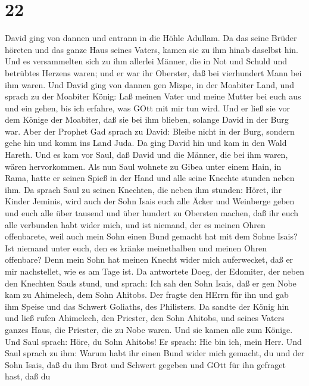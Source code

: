 \hypertarget{section-21}{%
\section{22}\label{section-21}}

 David ging von dannen und entrann in die Höhle Adullam. Da
das seine Brüder höreten und das ganze Haus seines Vaters, kamen sie zu
ihm hinab daselbst hin.  Und es versammelten sich zu ihm
allerlei Männer, die in Not und Schuld und betrübtes Herzens waren; und
er war ihr Oberster, daß bei vierhundert Mann bei ihm waren.
 Und David ging von dannen gen Mizpe, in der Moabiter Land,
und sprach zu der Moabiter König: Laß meinen Vater und meine Mutter bei
euch aus und ein gehen, bis ich erfahre, was GOtt mit mir tun wird.
 Und er ließ sie vor dem Könige der Moabiter, daß sie bei
ihm blieben, solange David in der Burg war.  Aber der
Prophet Gad sprach zu David: Bleibe nicht in der Burg, sondern gehe hin
und komm ins Land Juda. Da ging David hin und kam in den Wald Hareth.
 Und es kam vor Saul, daß David und die Männer, die bei ihm
waren, wären hervorkommen. Als nun Saul wohnete zu Gibea unter einem
Hain, in Rama, hatte er seinen Spieß in der Hand und alle seine Knechte
stunden neben ihm.  Da sprach Saul zu seinen Knechten, die
neben ihm stunden: Höret, ihr Kinder Jeminis, wird auch der Sohn Isais
euch alle Äcker und Weinberge geben und euch alle über tausend und über
hundert zu Obersten machen,  daß ihr euch alle verbunden
habt wider mich, und ist niemand, der es meinen Ohren offenbarete, weil
auch mein Sohn einen Bund gemacht hat mit dem Sohne Isais? Ist niemand
unter euch, den es kränke meinethalben und meinen Ohren offenbare? Denn
mein Sohn hat meinen Knecht wider mich auferwecket, daß er mir
nachstellet, wie es am Tage ist.  Da antwortete Doeg, der
Edomiter, der neben den Knechten Sauls stund, und sprach: Ich sah den
Sohn Isais, daß er gen Nobe kam zu Ahimelech, dem Sohn Ahitobs.
 Der fragte den HErrn für ihn und gab ihm Speise und das
Schwert Goliaths, des Philisters.  Da sandte der König hin
und ließ rufen Ahimelech, den Priester, den Sohn Ahitobs, und seines
Vaters ganzes Haus, die Priester, die zu Nobe waren. Und sie kamen alle
zum Könige.  Und Saul sprach: Höre, du Sohn Ahitobs! Er
sprach: Hie bin ich, mein Herr.  Und Saul sprach zu ihm:
Warum habt ihr einen Bund wider mich gemacht, du und der Sohn Isais, daß
du ihm Brot und Schwert gegeben und GOtt für ihn gefraget hast, daß du
